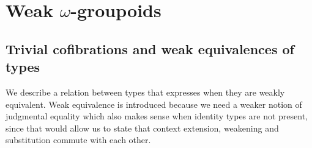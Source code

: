 \begin{comment}
\begin{defn}
A function $f:\prd{x:\terms{A}}\terms{\subst{x}{P}}$ is said to be \emph{continuous}
if there is a term of type
\begin{equation*}
\prd{x,y:\terms{A}}\terms{\subst{\ctxwk{A}{\mathcal{T}rans_{x,y}}}{\ctxwk{\idtypevar{A}}{\idtypevar{\subst{y}{P}}}}}.
\end{equation*}
\end{defn}

\begin{lem}
If all functions are ``continuous mappings of terms'' then types without terms
are empty, i.e.\ we have
\begin{equation*}
(\terms{A}\to\emptyt)\to\terms{A\to\emptyt^\mfGraph}
\end{equation*}
\end{lem}

\begin{proof}
Any function from a type without terms is vacuously continuous.
\end{proof}

We will see that in the graph model functions are not just continuous mappings
of terms, since there is a graph $\tilde{\emptyt}$ which has no terms but which
differs from the empty graph nevertheless.

\begin{desiderata}
The following may relate to functions being continuous mappings of terms (it
seems to be a very strong condition):
\begin{enumerate}
\item We have the adjunctions $\tfcolim\dashv\Delta\dashv\tflim$ in which the
two monads are idempotent (we don't even have the adjunctions for $\mfGraph$).
\item $\eqv{\terms{\Omega}}{\ctx}$
\end{enumerate}
We also need to check whether all functions in the reflexive graphs have this
property (if not, ditch this section).
\end{desiderata}
\end{comment}

\section{Weak $\omega$-groupoids}

\subsection{Trivial cofibrations and weak equivalences of types}
We describe a relation between types that expresses when they are weakly equivalent.
Weak equivalence is introduced because we need a weaker notion of judgmental 
equality which also makes sense when identity types are not present, since that
would allow us to state that context extension, weakening and substitution
commute with each other.

